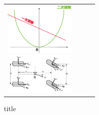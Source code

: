\documentclass[10pt]{jarticle}
\begin{document}
\clearpage
\begin{figure}[H]
  \begin{tabular}{cccc}
    
    \begin{minipage}{0.24\hsize}
      \begin{center}
        \includegraphics[clip,width=3.5cm]{figure/fig1.eps}
        \caption{title}
        \label{fig:label1}
      \end{center}
    \end{minipage}
    
    \begin{minipage}{0.24\hsize}
      \begin{center}
        \includegraphics[clip,width=3.5cm]{figure/fig2.eps}
        \caption{title}
        \label{fig:label2}
      \end{center}
    \end{minipage}
    
    
    
  \end{tabular}
\end{figure}  
\end{document}
